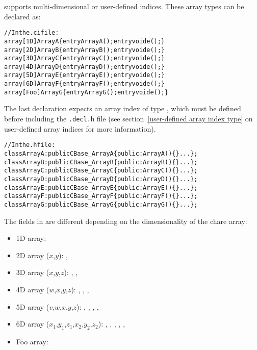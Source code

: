 \charmpp{} supports multi-dimensional or user-defined indices. These array types
can be declared as:
%
\begin{alltt}
//In the .ci file:
array [1D]  ArrayA \{ entry ArrayA(); entry void e();\}
array [2D]  ArrayB \{ entry ArrayB(); entry void e();\}
array [3D]  ArrayC \{ entry ArrayC(); entry void e();\}
array [4D]  ArrayD \{ entry ArrayD(); entry void e();\}
array [5D]  ArrayE \{ entry ArrayE(); entry void e();\}
array [6D]  ArrayF \{ entry ArrayF(); entry void e();\}
array [Foo] ArrayG \{ entry ArrayG(); entry void e();\}
\end{alltt}
%
The last declaration expects an array index of type ,
which must be defined before including the \texttt{.decl.h} file (see
section~\ref{user-defined array index type} on user-defined array indices for
more information).
%
\begin{alltt}
//In the .h file:
class ArrayA : public CBase\_ArrayA \{ public: ArrayA()\{\} ...\};
class ArrayB : public CBase\_ArrayB \{ public: ArrayB()\{\} ...\};
class ArrayC : public CBase\_ArrayC \{ public: ArrayC()\{\} ...\};
class ArrayD : public CBase\_ArrayD \{ public: ArrayD()\{\} ...\};
class ArrayE : public CBase\_ArrayE \{ public: ArrayE()\{\} ...\};
class ArrayF : public CBase\_ArrayF \{ public: ArrayF()\{\} ...\};
class ArrayG : public CBase\_ArrayG \{ public: ArrayG()\{\} ...\};
\end{alltt}
%
The fields in  are different depending on the dimensionality of
the chare array:
%
\begin{itemize}
\item 1D array: 
\item 2D array ($x$,$y$): , 
\item 3D array ($x$,$y$,$z$): , ,
\item 4D array ($w$,$x$,$y$,$z$): , ,
  , 
\item 5D array ($v$,$w$,$x$,$y$,$z$): , ,
  , , 
\item 6D array ($x_1$,$y_1$,$z_1$,$x_2$,$y_2$,$z_2$): ,
  , , , ,
\item Foo array: 
\end{itemize}

